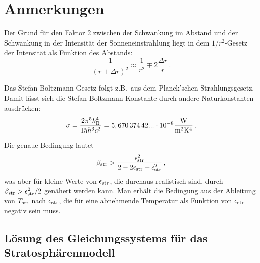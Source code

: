 
\section{Anmerkungen}

\begin{anmerkungen}
\item
\label{Anm-1}%
Der Grund f\"ur den Faktor 2 zwischen der Schwankung im Abstand und
der Schwankung in der Intensit\"at der Sonneneinstrahlung liegt in dem $1/r^2$-Gesetz
der Intensit\"at als Funktion des Abstands:
\begin{equation}
        \frac{1}{(r\pm \Delta r)^2} \approx \frac{1}{r^2} \mp 2 \frac{\Delta r}{r} \, .
\end{equation}

\item
\label{Anm-2}
Das Stefan-Boltzmann-Gesetz folgt z.B.\ aus dem Planck'schen Strahlungsgesetz.
Damit l\"asst sich die Stefan-Boltzmann-Konstante durch andere Naturkonstanten
ausdr\"ucken:
\begin{equation}
        \sigma = \frac{2 \pi^5 k_{\rm B}^4}{15 h^3 c^2} = 5,670\,374\,42... \cdot 10^{-8} \frac{\rm W}{\rm m^2 K^4} \, .
\end{equation}
\item
\label{Anm-3}
Die genaue Bedingung lautet
\begin{equation}
               \beta_{\rm str} >  \frac{\epsilon_{\rm str}^2}{2 - 2 \epsilon_{\rm str} + \epsilon_{\rm str}^2} \, ,
\end{equation}
was aber f\"ur kleine Werte von $\epsilon_{\rm str}$, die durchaus realistisch sind, durch
$\beta_{\rm str} > \epsilon_{\rm str}^2/2$ gen\"ahert werden kann. Man erh\"alt die Bedingung
aus der Ableitung von $T_{\rm str}$ nach $\epsilon_{\rm str}$, die f\"ur eine abnehmende Temperatur
als Funktion von $\epsilon_{\rm str}$ negativ sein muss. 
\end{anmerkungen}

\subsection{L\"osung des Gleichungssystems f\"ur das Stratosph\"arenmodell}
\label{Anm_Strat}


